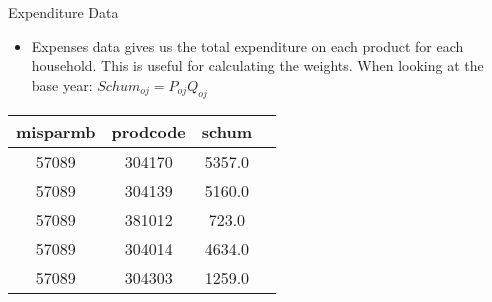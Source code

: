 \documentclass{beamer}
\begin{document}
\begin{frame}{Expenditure Data}
    \begin{itemize}
        \item Expenses data gives us the total expenditure on each product for each household. This is useful for calculating the weights. When looking at the base year: $Schum_{oj} = P_{oj}Q_{oj}$
    \end{itemize}
    \begin{table}[h]
        \centering
        \begin{tabular}{c c c c}
            \hline
            \textbf{misparmb} & \textbf{prodcode} & \textbf{schum} \\
            \hline
            57089             & 304170            & 5357.0         \\
            57089             & 304139            & 5160.0         \\
            57089             & 381012            & 723.0          \\
            57089             & 304014            & 4634.0         \\
            57089             & 304303            & 1259.0         \\
            \hline
        \end{tabular}
        \label{tab:expenses_table}
    \end{table}
\end{frame}
\end{document}
